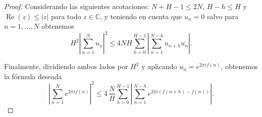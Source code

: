 \begin{proof}
    Considerando las siguientes acotaciones: $N+H-1 \leq 2N$, $H-h \leq H$ y 
    $\operatorname{Re}(z) \leq |z|$ para todo $z \in \mathbb{C}$, y teniendo en cuenta
    que $u_n=0$ salvo para $n=1,\dots,N$ obtenemos
    \[
        H^2 \left| \sum_{n=1}^{N} u_n \right|^2 \leq
        4N H \sum_{h=0}^{H-1} \left| \sum_{n=1}^{N-h} u_{n+h} \overline{u_n} \right|.
    \]

    Finalmente, dividiendo ambos lados por $H^2$ y aplicando $u_n = e^{2\pi i f(n)}$,
    obtenemos la fórmula deseada
    \[
        \left| \sum_{n=1}^N e^{2\pi i f(n)} \right|^2 \leq
        4 \, \frac{N}{H} \sum_{h=0}^{H-1} \left| \sum_{n=1}^{N-h} e^{2\pi i (f(n+h) - f(n))} \right|.
    \]
\end{proof}